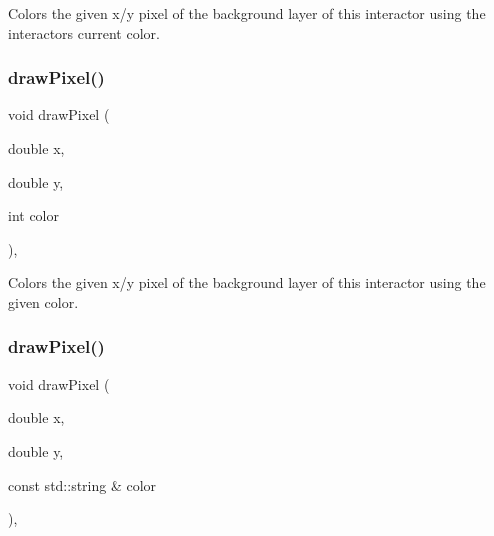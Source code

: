Colors the given x/y pixel of the background layer of this interactor using the interactor\textquotesingle{}s current color. 

\mbox{\label{classsgl_1_1GDrawingSurface_a3a64eb6383e601be8438e9c71643c432}} 
\subsubsection{\texorpdfstring{draw\+Pixel()}{drawPixel()}\hspace{0.1cm}{\footnotesize\ttfamily [2/3]}}
{\footnotesize\ttfamily void draw\+Pixel (\begin{DoxyParamCaption}\item[{double}]{x,  }\item[{double}]{y,  }\item[{int}]{color }\end{DoxyParamCaption})\hspace{0.3cm}{\ttfamily [virtual]}, {\ttfamily [inherited]}}



Colors the given x/y pixel of the background layer of this interactor using the given color. 

\mbox{\label{classsgl_1_1GDrawingSurface_a20abc26a94b7eb310e34abf668e0f5f4}} 
\subsubsection{\texorpdfstring{draw\+Pixel()}{drawPixel()}\hspace{0.1cm}{\footnotesize\ttfamily [3/3]}}
{\footnotesize\ttfamily void draw\+Pixel (\begin{DoxyParamCaption}\item[{double}]{x,  }\item[{double}]{y,  }\item[{const std\+::string \&}]{color }\end{DoxyParamCaption})\hspace{0.3cm}{\ttfamily [virtual]}, {\ttfamily [inherited]}}



